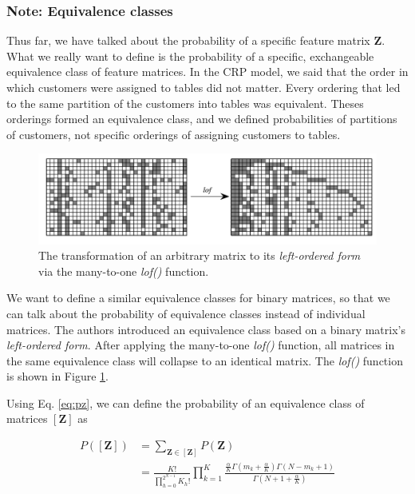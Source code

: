 \documentclass[twoside]{article}
\begin{document}
\subsubsection*{Note: Equivalence classes}
Thus far, we have talked about the probability of a specific feature matrix $\mathbf{Z}$. What we really want to define is the probability of a specific, exchangeable equivalence class of feature matrices. In the CRP model, we said that the order in which customers were assigned to tables did not matter. Every ordering that led to the same partition of the customers into tables was equivalent. Theses orderings formed an equivalence class, and we defined probabilities of partitions of customers, not specific orderings of assigning customers to tables. 

\begin{figure}[h]
  \centering
    \includegraphics[scale=0.35]{lof}
  \caption{The transformation of an arbitrary matrix to its \textit{left-ordered form} via the many-to-one \textit{lof()} function.}
  \label{fig:lof}
\end{figure}

We want to define a similar equivalence classes for binary matrices, so that we can talk about the probability of equivalence classes instead of individual matrices. The authors introduced an equivalence class based on a binary matrix's \textit{left-ordered form}. After applying the many-to-one \textit{lof()} function, all matrices in the same equivalence class will collapse to an identical matrix. The \textit{lof()} function is shown in Figure \ref{fig:lof}. 

Using Eq. \ref{eq:pz}, we can define the probability of an equivalence class of matrices $[\mathbf{Z}]$ as

\begin{equation}
\begin{split}
    P([\mathbf{Z}]) & = \sum_{\mathbf{Z} \in [\mathbf{Z}]} P(\mathbf{Z}) \\
    & = \frac{K!}{\prod_{h = 0}^{2^{N-1}}K_h!}\prod_{k=1}^K \frac{\frac{\alpha}{K} \Gamma(m_k + \frac{\alpha}{K}) \Gamma(N - m_k + 1)}{\Gamma(N + 1 + \frac{\alpha}{K})}
\end{split}
    \label{eq:pe}
\end{equation}
\end{document}
